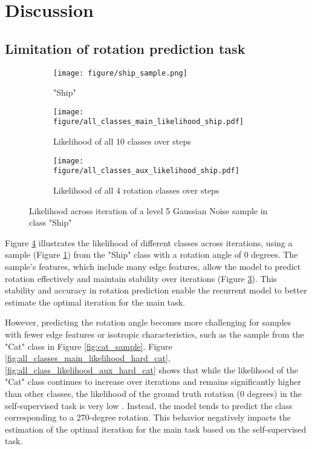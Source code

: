 \section{Discussion}
\subsection{Limitation of rotation prediction task}
\begin{figure}[t!]
    \centering
    \begin{subfigure}{0.1\textwidth}
        \texttt{[image: figure/ship\_sample.png]}
        \caption{"Ship"}
        \label{fig:ship_sample}
    \end{subfigure}
    \vfill
    \begin{subfigure}{0.22\textwidth}
        \texttt{[image: figure/all\_classes\_main\_likelihood\_ship.pdf]}
        \caption{Likelihood of all 10 classes over steps}
        \label{fig:all_classes_main_likelihood_hard_ship}
    \end{subfigure}
    \begin{subfigure}{0.22\textwidth}
        \texttt{[image: figure/all\_classes\_aux\_likelihood\_ship.pdf]}
        \caption{Likelihood of all 4 rotation classes over steps}
        \label{fig:all_class_likelihood_aux_hard_ship}
    \end{subfigure}
    \caption{Likelihood across iteration of a level 5 Gaussian Noise sample in class "Ship"}
    \label{fig:likelihood_ship}
\end{figure}
Figure \ref{fig:likelihood_ship} illustrates the likelihood of different classes across iterations, using a sample (Figure \ref{fig:ship_sample}) from the "Ship" class with a rotation angle of 0 degrees. The sample's features, which include many edge features, allow the model to predict rotation effectively and maintain stability over iterations (Figure \ref{fig:all_class_likelihood_aux_hard_ship}). This stability and accuracy in rotation prediction enable the recurrent model to better estimate the optimal iteration for the main task.

However, predicting the rotation angle becomes more challenging for samples with fewer edge features or isotropic characteristics, such as the sample from the "Cat" class in Figure \ref{fig:cat_sample}. Figure \ref{fig:all_classes_main_likelihood_hard_cat}, \ref{fig:all_class_likelihood_aux_hard_cat} shows that while the likelihood of the "Cat" class continues to increase over iterations and remains significantly higher than other classes, the likelihood of the ground truth rotation (0 degrees) in the self-supervised task is very low . Instead, the model tends to predict the class corresponding to a 270-degree rotation. This behavior negatively impacts the estimation of the optimal iteration for the main task based on the self-supervised task.

